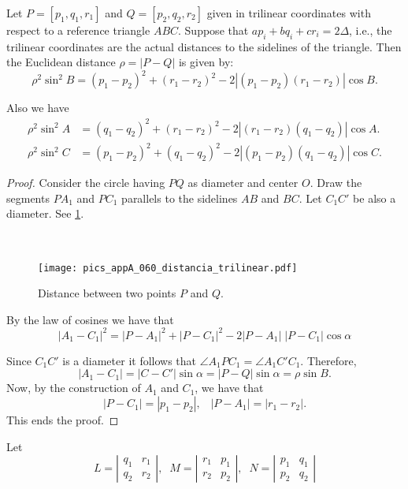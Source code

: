 \begin{proposition} Let $P =[p_1,q_1,r_1]$ and $Q=[p_2,q_2,r_2] $ given in trilinear coordinates with respect to
	a reference triangle $ABC$. Suppose that $ap_i+bq_i+cr_i=2\Delta$, i.e., the trilinear coordinates are the actual distances to the sidelines of the triangle.
	Then the  Euclidean distance  $\rho=|P -Q|$ is given by:
		\[ \rho^2\sin^2 B =(p_1-p_2)^2+(r_1-r_2)^2-2|(p_1-p_2)(r_1-r_2)|\cos B.\]
	
	Also we have 
	\begin{align*}
		  \rho^2\sin^2 A&=(q_1-q_2)^2+(r_1-r_2)^2- 2|(r_1-r_2)(q_1-q_2)|\cos A.\\
		 \rho^2\sin^2 C&=(p_1-p_2)^2+(q_1-q_2)^2- 2|(p_1-p_2)(q_1-q_2)|\cos C.	
	\end{align*}
\label{prop:distancePQ}
	\end{proposition}

\begin{proof}
	Consider the  circle  having $PQ$ as diameter and center $O$.   Draw the segments $PA_1$ and $PC_1$ parallels to the sidelines $AB$ and $BC$. Let $C_1C'$ be also a diameter. See  \cref{fig:distance_tri}.
		\begin{figure}[H]\ 
		\begin{center}
			\texttt{[image: pics\_appA\_060\_distancia\_trilinear.pdf]}
			\caption { \label{fig:distance_tri}   Distance between two points $P$ and $Q$.}
		\end{center}
	\end{figure}
By the law of cosines we have that
\[ |A_1-C_1|^2=|P-A_1|^2+|P-C_1|^2-2|P-A_1| \;|P-C_1| \cos \alpha \]

Since $C_1C'$ is a diameter it follows that $\angle A_1PC_1=\angle A_1C'C_1$. Therefore,
\[  |A_1-C_1|=|C-C'| \sin\alpha= |P-Q|\sin\alpha= \rho \sin B.\]
Now, by the construction of $A_1$ and $C_1$, we have that
\[ |P-C_1|= |p_1-p_2|,\;\;\;  |P-A_1|=| r_1-r_2|.\]
	This ends the proof.
\end{proof}

Let \[L=\left| \begin{matrix} q_1&r_1\\
q_2&r_2 \end{matrix} \right|, \;\;M=\left| \begin{matrix} r_1&p_1\\
r_2&p_2 \end{matrix} \right|,\;\; N=\left| \begin{matrix} p_1&q_1\\
p_2&q_2 \end{matrix} \right|   \]

